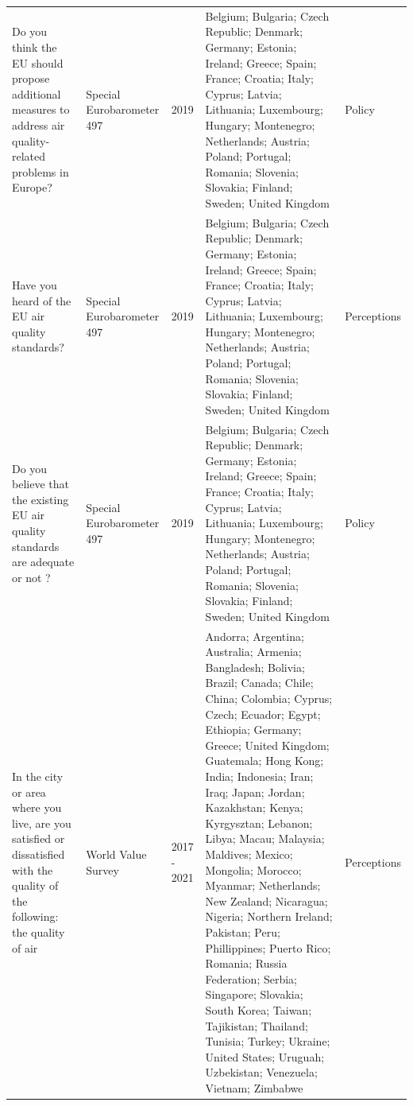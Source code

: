 {\begin{longtable}[t]{p{6cm}lp{2cm}p{4cm}p{2.5cm}}
Do you think the EU should propose additional measures to address air quality-related problems in Europe? & Special Eurobarometer 497 & 2019 & Belgium; Bulgaria; Czech Republic; Denmark; Germany; Estonia; Ireland; Greece; Spain; France; Croatia; Italy; Cyprus; Latvia; Lithuania; Luxembourg; Hungary; Montenegro; Netherlands; Austria; Poland; Portugal; Romania; Slovenia; Slovakia; Finland; Sweden; United Kingdom & Policy\\
Have you heard of the EU air quality standards? & Special Eurobarometer 497 & 2019 & Belgium; Bulgaria; Czech Republic; Denmark; Germany; Estonia; Ireland; Greece; Spain; France; Croatia; Italy; Cyprus; Latvia; Lithuania; Luxembourg; Hungary; Montenegro; Netherlands; Austria; Poland; Portugal; Romania; Slovenia; Slovakia; Finland; Sweden; United Kingdom & Perceptions\\
\addlinespace
Do you believe that the existing EU air quality standards are adequate or not ? & Special Eurobarometer 497 & 2019 & Belgium; Bulgaria; Czech Republic; Denmark; Germany; Estonia; Ireland; Greece; Spain; France; Croatia; Italy; Cyprus; Latvia; Lithuania; Luxembourg; Hungary; Montenegro; Netherlands; Austria; Poland; Portugal; Romania; Slovenia; Slovakia; Finland; Sweden; United Kingdom & Policy\\
In the city or area where you live, are you satisfied or dissatisfied with the quality of the following: the quality of air & World Value Survey & 2017 - 2021 & Andorra; Argentina; Australia; Armenia; Bangladesh; Bolivia; Brazil; Canada; Chile; China; Colombia; Cyprus; Czech; Ecuador; Egypt; Ethiopia; Germany; Greece; United Kingdom; Guatemala; Hong Kong; India; Indonesia; Iran; Iraq; Japan; Jordan; Kazakhstan; Kenya; Kyrgysztan; Lebanon; Libya; Macau; Malaysia; Maldives; Mexico; Mongolia; Morocco; Myanmar; Netherlands; New Zealand; Nicaragua; Nigeria; Northern Ireland; Pakistan; Peru; Phillippines; Puerto Rico; Romania; Russia Federation; Serbia; Singapore; Slovakia; South Korea; Taiwan; Tajikistan; Thailand; Tunisia; Turkey; Ukraine; United States; Uruguah; Uzbekistan; Venezuela; Vietnam; Zimbabwe & Perceptions\\
\bottomrule
\end{longtable}
}
